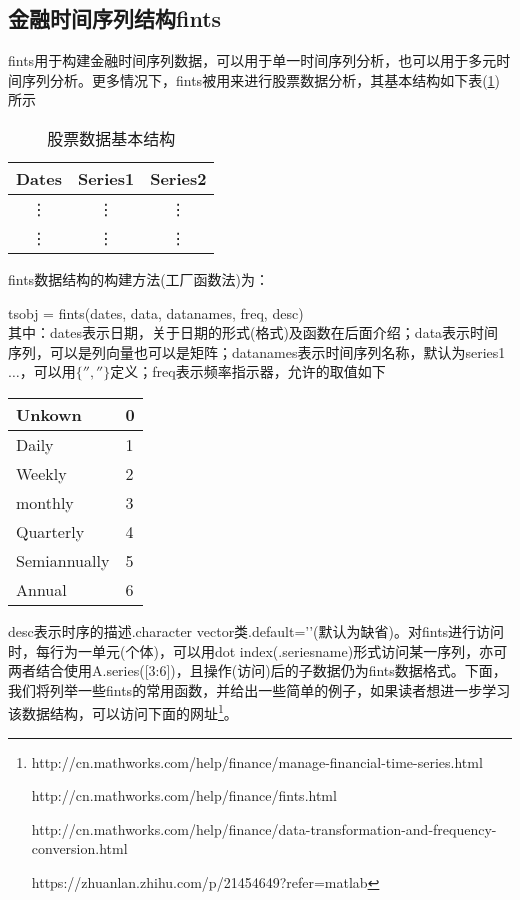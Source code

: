    \subsection{金融时间序列结构fints}
        \par
        fints用于构建金融时间序列数据，可以用于单一时间序列分析，也可以用于多元时间序列分析。更多情况下，fints被用来进行股票数据分析，其基本结构如下表(\ref{tab:股票数据基本结构})所示
        \begin{table}[H]
        \centering
        \caption{股票数据基本结构}
        \label{tab:股票数据基本结构}
          \begin{tabular}{c|c|c}
            \hline
            Dates & Series1 & Series2\\
            \hline
            \vdots &\vdots & \vdots \\
            \vdots &\vdots & \vdots \\
        \end{tabular}
        \end{table}
        fints数据结构的构建方法(工厂函数法)为：
        \par
        tsobj = fints(dates, data, datanames, freq, desc)\\
        其中：dates表示日期，关于日期的形式(格式)及函数在后面介绍；data表示时间序列，可以是列向量也可以是矩阵；datanames表示时间序列名称，默认为series1$\dots$，可以用$\{'', ''\}$定义；freq表示频率指示器，允许的取值如下
        \begin{table}[H]
        \centering
        \label{tab:freq允许的取值有}
          \begin{tabular}{l|l}
            \hline
            Unkown & 0\\
            \hline
            Daily &1\\
            \hline
            Weekly & 2\\
            \hline
            monthly &3\\
            \hline
            Quarterly &4\\
            \hline
            Semiannually & 5\\
            \hline
            Annual & 6\\
            \hline
        \end{tabular}
        \end{table}
        \par
        desc表示时序的描述.character vector类.default=’’(默认为缺省)。对fints进行访问时，每行为一单元(个体)，可以用dot index(.seriesname)形式访问某一序列，亦可两者结合使用A.series([3:6])，且操作(访问)后的子数据仍为fints数据格式。下面，我们将列举一些fints的常用函数，并给出一些简单的例子，如果读者想进一步学习该数据结构，可以访问下面的网址\footnote{http://cn.mathworks.com/help/finance/manage-financial-time-series.html\par
        http://cn.mathworks.com/help/finance/fints.html\par
        http://cn.mathworks.com/help/finance/data-transformation-and-frequency-conversion.html\par
        https://zhuanlan.zhihu.com/p/21454649?refer=matlab
        }。
